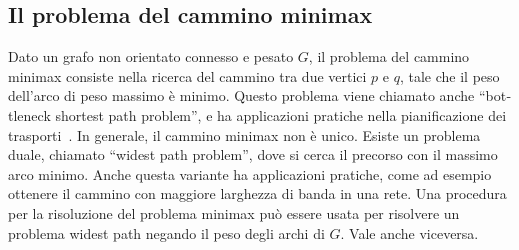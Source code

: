\documentclass[target=bach,aauheader=,style=]{thud}
\newcommand{\eng}[1]{\foreignlanguage{english}{#1}}
\begin{document}
\subsection{Il problema del cammino minimax}\label{ghs:minimax}
 
Dato un grafo non orientato connesso e pesato $G$, il problema del cammino minimax consiste nella ricerca del cammino tra due vertici $p$ e $q$, tale che il peso dell'arco di peso massimo è minimo. Questo problema viene chiamato anche ``\eng{bottleneck shortest path problem}'', e ha applicazioni pratiche nella pianificazione dei trasporti~\cite{doi:10.1287/trsc.21.2.115}. In generale, il cammino minimax non è unico. Esiste un problema duale, chiamato ``\eng{widest path problem}'', dove si cerca il precorso con il massimo arco minimo. Anche questa variante ha applicazioni pratiche, come ad esempio ottenere il cammino con maggiore larghezza di banda in una rete. Una procedura per la risoluzione del problema minimax può essere usata per risolvere un problema \eng{widest path} negando il peso degli archi di $G$. Vale anche viceversa.
\end{document}
